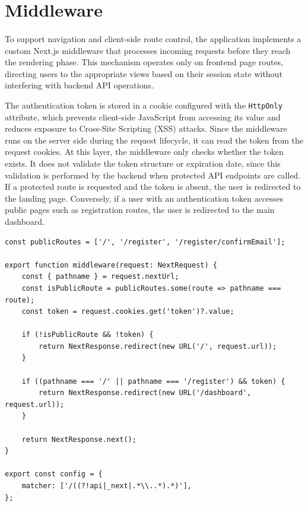 \section{Middleware} \label{sec:middleware_web}
\paragraph{}To support navigation and client-side route control, the application implements a custom Next.js middleware that processes incoming requests before they reach the rendering phase. This mechanism operates only on frontend page routes, directing users to the appropriate views based on their session state without interfering with backend API operations.

The authentication token is stored in a cookie configured with the \texttt{HttpOnly} attribute, which prevents client-side JavaScript from accessing its value and reduces exposure to Cross-Site Scripting (XSS) attacks. Since the middleware runs on the server side during the request lifecycle, it can read the token from the request cookies. At this layer, the middleware only checks whether the token exists. It does not validate the token structure or expiration date, since this validation is performed by the backend when protected API endpoints are called. If a protected route is requested and the token is absent, the user is redirected to the landing page. Conversely, if a user with an authentication token accesses public pages such as registration routes, the user is redirected to the main dashboard.

\begin{lstlisting}[caption={Middleware routing controls}, label={lst:middleware_frontend_web}]
const publicRoutes = ['/', '/register', '/register/confirmEmail'];

export function middleware(request: NextRequest) {
    const { pathname } = request.nextUrl;
    const isPublicRoute = publicRoutes.some(route => pathname === route);
    const token = request.cookies.get('token')?.value;

    if (!isPublicRoute && !token) {
        return NextResponse.redirect(new URL('/', request.url));
    }

    if ((pathname === '/' || pathname === '/register') && token) {
        return NextResponse.redirect(new URL('/dashboard', request.url));
    }

    return NextResponse.next();
}

export const config = {
    matcher: ['/((?!api|_next|.*\\..*).*)'],
};
\end{lstlisting}

